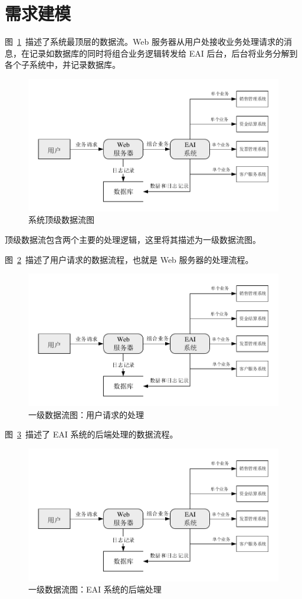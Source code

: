 \documentclass[cs4size,a4paper,nofonts]{ctexart}
\begin{document}
\section{需求建模}

图~\ref{dfd0}~描述了系统最顶层的数据流。Web 服务器从用户处接收业务处理请求的消息，在记录如数据库的同时将组合业务逻辑转发给 EAI 后台，后台将业务分解到各个子系统中，并记录数据库。

\begin{figure}[htp]
\includegraphics[width=\textwidth,page=1]{images/dfd.pdf}
\caption{\label{dfd0}系统顶级数据流图}
\end{figure}

顶级数据流包含两个主要的处理逻辑，这里将其描述为一级数据流图。

图~\ref{dfd1.1}~描述了用户请求的数据流程，也就是 Web 服务器的处理流程。

\begin{figure}[htp]
\includegraphics[width=\textwidth,page=2]{images/dfd.pdf}
\caption{\label{dfd1.1}一级数据流图：用户请求的处理}
\end{figure}

图~\ref{dfd1.2}~描述了 EAI 系统的后端处理的数据流程。

\begin{figure}[htp]
\includegraphics[width=\textwidth,page=3]{images/dfd.pdf}
\caption{\label{dfd1.2}一级数据流图：EAI 系统的后端处理}
\end{figure}
\end{document}
